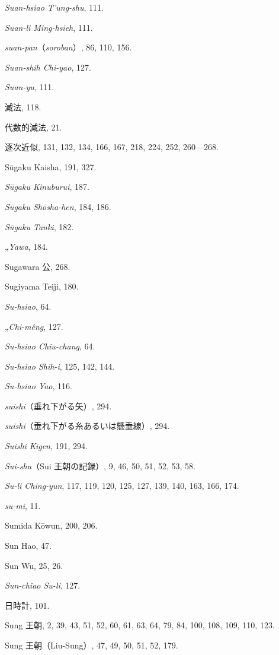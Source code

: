 \documentclass[11pt]{article}
\begin{document}
\emph{Suan-hsiao T'ung-shu}, 111.\par
\emph{Suan-li Ming-hsieh}, 111.\par
\emph{suan-pan}（\emph{soroban}）, 86, 110, 156.\par
\emph{Suan-shih Chi-yao}, 127.\par
\emph{Suan-yu}, 111.\par
減法, 118.\par
代数的減法, 21.\par
逐次近似, 131, 132, 134, 166, 167, 218, 224, 252, 260---268.\par
Sūgaku Kaisha, 191, 327.\par
\emph{Sūgaku Kinuburui}, 187.\par
\emph{Sūgaku Shōsha-hen}, 184, 186.\par
\emph{Sūgaku Tanki}, 182.\par
\quad „\quad \emph{Yawa}, 184.\par
Sugawara 公, 268.\par
Sugiyama Teiji, 180.\par
\emph{Su-hsiao}, 64.\par
\quad „\quad \emph{Chi-mêng}, 127.\par
\emph{Su-hsiao Chiu-chang}, 64.\par
\emph{Su-hsiao Shih-i}, 125, 142, 144.\par
\emph{Su-hsiao Yao}, 116.\par
\emph{suishi}（垂れ下がる矢）, 294.\par
\emph{suishi}（垂れ下がる糸あるいは懸垂線）, 294.\par
\emph{Suishi Kigen}, 191, 294.\par
\emph{Sui-shu}（Sui 王朝の記録）, 9, 46, 50, 51, 52, 53, 58.\par
\emph{Su-li Ching-yun}, 117, 119, 120, 125, 127, 139, 140, 163, 166, 174.\par
\emph{su-mi}, 11.\par
Sumida Kōwun, 200, 206.\par
Sun Hao, 47.\par
Sun Wu, 25, 26.\par
\emph{Sun-chiao Su-li}, 127.\par
日時計, 101.\par
Sung 王朝, 2, 39, 43, 51, 52, 60, 61, 63, 64, 79, 84, 100, 108, 109, 110, 123.\par
Sung 王朝（Liu-Sung）, 47, 49, 50, 51, 52, 179.\par
\end{document}
